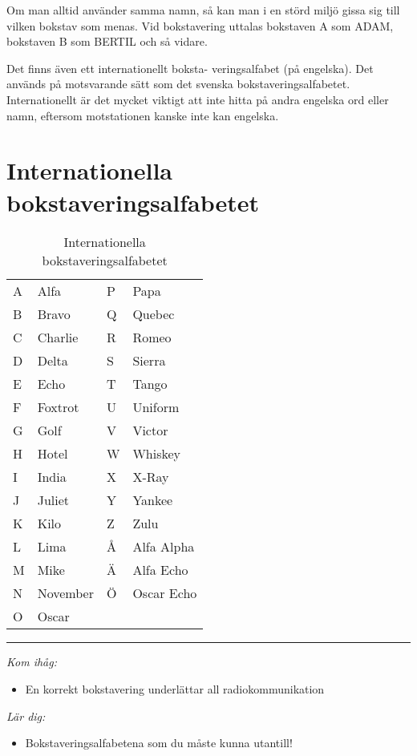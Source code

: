 Om man alltid använder samma namn, så kan man i en störd miljö gissa
sig till vilken bokstav som menas. Vid bokstavering uttalas bokstaven
A som ADAM, bokstaven B som BERTIL och så vidare.

Det finns även ett internationellt boksta- veringsalfabet (på
engelska). Det används på motsvarande sätt som det svenska
bokstaveringsalfabetet. Internationellt är det mycket viktigt att inte
hitta på andra engelska ord eller namn, eftersom motstationen kanske
inte kan engelska.

\section{Internationella bokstaveringsalfabetet}

\begin{table}[h]
  \begin{tabular}{ll|ll}
    A & Alfa     & P & Papa  \\
    B & Bravo    & Q & Quebec\\
    C & Charlie  & R & Romeo\\
    D & Delta    & S & Sierra\\
    E & Echo     & T & Tango\\
    F & Foxtrot  & U & Uniform\\
    G & Golf     & V & Victor\\
    H & Hotel    & W & Whiskey \\
    I & India    & X & X-Ray\\
    J & Juliet   & Y & Yankee\\
    K & Kilo     & Z & Zulu\\
    L & Lima     & Å & Alfa Alpha\\
    M & Mike     & Ä & Alfa Echo\\
    N & November & Ö & Oscar Echo\\
    O & Oscar    & & \\
  \end{tabular}
  \caption{Internationella bokstaveringsalfabetet}
  \label{tab:int-bokstavering}
\end{table}



\vspace{1em} \hrule \vspace{1em}

\emph{Kom ihåg:}


\begin{itemize}
\item En korrekt bokstavering underlättar all radiokommunikation
\end{itemize}

\emph{Lär dig:}

\begin{itemize}
\item Bokstaveringsalfabetena som du måste kunna utantill!
\end{itemize}
